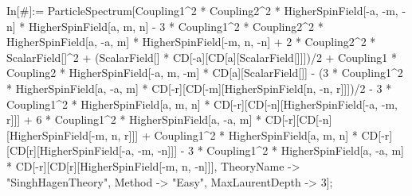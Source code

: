 In[\#]:= ParticleSpectrum[Coupling1^2 * Coupling2^2 * HigherSpinField[-a, -m, -n] * HigherSpinField[a, m, n] - 3 * Coupling1^2 * Coupling2^2 * HigherSpinField[a, -a, m] * HigherSpinField[-m, n, -n] + 2 * Coupling2^2 * ScalarField[]^2 + (ScalarField[] * CD[-a][CD[a][ScalarField[]]])/2 + Coupling1 * Coupling2 * HigherSpinField[-a, m, -m] * CD[a][ScalarField[]] - (3 * Coupling1^2 * HigherSpinField[a, -a, m] * CD[-r][CD[-m][HigherSpinField[n, -n, r]]])/2 - 3 * Coupling1^2 * HigherSpinField[a, m, n] * CD[-r][CD[-n][HigherSpinField[-a, -m, r]]] + 6 * Coupling1^2 * HigherSpinField[a, -a, m] * CD[-r][CD[-n][HigherSpinField[-m, n, r]]] + Coupling1^2 * HigherSpinField[a, m, n] * CD[-r][CD[r][HigherSpinField[-a, -m, -n]]] - 3 * Coupling1^2 * HigherSpinField[a, -a, m] * CD[-r][CD[r][HigherSpinField[-m, n, -n]]], TheoryName -> "SinghHagenTheory", Method -> "Easy", MaxLaurentDepth -> 3]; 